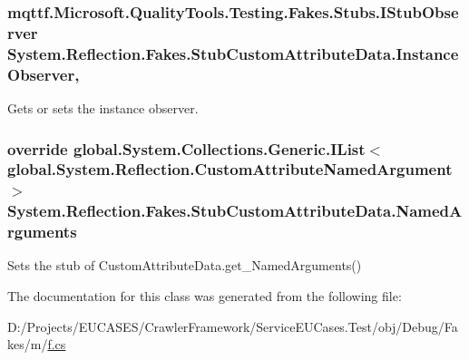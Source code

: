 \hypertarget{class_system_1_1_reflection_1_1_fakes_1_1_stub_custom_attribute_data_a5850b07126b5899938240dc0840d5af9}{
\subsubsection[{Instance\-Observer}]{\setlength{\rightskip}{0pt plus 5cm}mqttf.\-Microsoft.\-Quality\-Tools.\-Testing.\-Fakes.\-Stubs.\-I\-Stub\-Observer System.\-Reflection.\-Fakes.\-Stub\-Custom\-Attribute\-Data.\-Instance\-Observer\hspace{0.3cm}{\ttfamily [get]}, {\ttfamily [set]}}}\label{class_system_1_1_reflection_1_1_fakes_1_1_stub_custom_attribute_data_a5850b07126b5899938240dc0840d5af9}


Gets or sets the instance observer.

\hypertarget{class_system_1_1_reflection_1_1_fakes_1_1_stub_custom_attribute_data_a9382a6fc9bc2459c0b5377978f40fd28}{
\subsubsection[{Named\-Arguments}]{\setlength{\rightskip}{0pt plus 5cm}override global.\-System.\-Collections.\-Generic.\-I\-List$<$global.\-System.\-Reflection.\-Custom\-Attribute\-Named\-Argument$>$ System.\-Reflection.\-Fakes.\-Stub\-Custom\-Attribute\-Data.\-Named\-Arguments\hspace{0.3cm}{\ttfamily [get]}}}\label{class_system_1_1_reflection_1_1_fakes_1_1_stub_custom_attribute_data_a9382a6fc9bc2459c0b5377978f40fd28}


Sets the stub of Custom\-Attribute\-Data.\-get\-\_\-\-Named\-Arguments()



The documentation for this class was generated from the following file\-:\begin{DoxyCompactItemize}
\item 
D\-:/\-Projects/\-E\-U\-C\-A\-S\-E\-S/\-Crawler\-Framework/\-Service\-E\-U\-Cases.\-Test/obj/\-Debug/\-Fakes/m/\hyperlink{m_2f_8cs}{f.\-cs}\end{DoxyCompactItemize}
